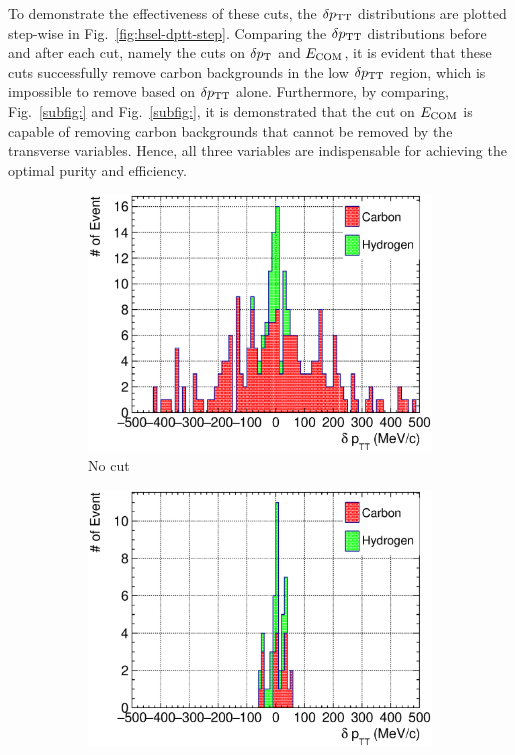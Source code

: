      To demonstrate the effectiveness of these cuts, the $\delta p_\textrm{TT}$ distributions are plotted step-wise in Fig.~\ref{fig:hsel-dptt-step}.
     Comparing the $\delta p_\textrm{TT}$ distributions before and after each cut, namely the cuts on $\delta p_\textrm{T}$ and $E_{\textrm{COM}}$, it is evident that these cuts successfully remove carbon backgrounds in the low $\delta p_\textrm{TT}$ region, which is impossible to remove based on $\delta p_\textrm{TT}$ alone.
     Furthermore, by comparing, Fig.~\ref{subfig:} and Fig.~\ref{subfig:}, it is demonstrated that the cut on $E_{\textrm{COM}}$ is capable of removing carbon backgrounds that cannot be removed by the transverse variables.
     Hence, all three variables are indispensable for achieving the optimal purity and efficiency.
     \begin{figure}
     \begin{subfigure}[b]{\trfigwid\textwidth}
          \centering
          \includegraphics[width=\textwidth]{figures/perf/tki/SFGpTPCmu_dptt_stack_al15.eps}
          \caption{No cut}
          \label{subfig:hsel-dang-nocut}
     \end{subfigure}
     \begin{subfigure}[b]{\trfigwid\textwidth}
          \centering
          \includegraphics[width=\textwidth]{figures/perf/tki/SFGpTPCmu_dptt_stack_al15_dpt80.eps}

\end{subfigure}
\end{figure}
